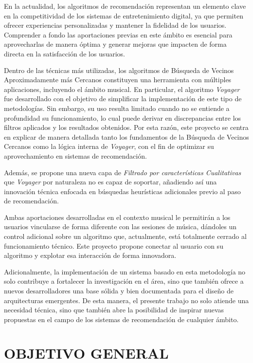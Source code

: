En la actualidad, los algoritmos de recomendación representan un elemento clave en la competitividad de los sistemas de entretenimiento digital, ya que permiten ofrecer experiencias personalizadas y mantener la fidelidad de los usuarios. Comprender a fondo las aportaciones previas en este ámbito es esencial para aprovecharlas de manera óptima y generar mejoras que impacten de forma directa en la satisfacción de los usuarios.

Dentro de las técnicas más utilizadas, los algoritmos de Búsqueda de Vecinos Aproximadamente más Cercanos constituyen una herramienta con múltiples aplicaciones, incluyendo el ámbito musical. En particular, el algoritmo \textit{Voyager} fue desarrollado con el objetivo de simplificar la implementación de este tipo de metodologías. Sin embargo, su uso resulta limitado cuando no se entiende a profundidad su funcionamiento, lo cual puede derivar en discrepancias entre los filtros aplicados y los resultados obtenidos. Por esta razón, este proyecto se centra en explicar de manera detallada tanto los fundamentos de la Búsqueda de Vecinos Cercanos como la lógica interna de \textit{Voyager}, con el fin de optimizar su aprovechamiento en sistemas de recomendación.

Además, se propone una nueva capa de \textit{Filtrado por características Cualitativas} que \textit{Voyager} por naturaleza no es capaz de soportar, añadiendo así una innovación técnica enfocada en búsquedas heurísticas adicionales previo al paso de recomendación.

Ambas aportaciones desarrolladas en el contexto musical le permitirán a los usuarios vincularse de forma diferente con las sesiones de música, dándoles un control adicional sobre un algoritmo que, actualmente, está totalmente cerrado al funcionamiento técnico. Este proyecto propone conectar al usuario con su algoritmo y explotar esa interacción de forma innovadora.

Adicionalmente, la implementación de un sistema basado en esta metodología no solo contribuye a fortalecer la investigación en el área, sino que también ofrece a nuevos desarrolladores una base sólida y bien documentada para el diseño de arquitecturas emergentes. De esta manera, el presente trabajo no solo atiende una necesidad técnica, sino que también abre la posibilidad de inspirar nuevas propuestas en el campo de los sistemas de recomendación de cualquier ámbito.


\newpage

\section*{OBJETIVO GENERAL}



